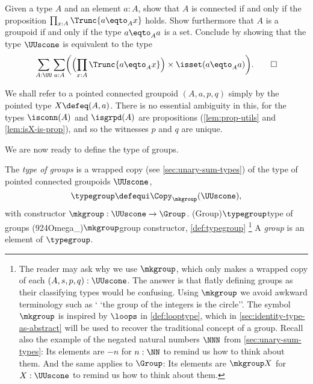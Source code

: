 \begin{xca}\label{xca:defgroup}
  Given a type $A$ and an element $a:A$, 
  show that $A$ is connected if and only if the proposition 
  $\prod_{x:A}\Trunc{a \eqto_A x}$ holds.
  Show furthermore that $A$ is a groupoid if and only if the 
  type $a\eqto_A a$ is a set.
  Conclude by showing that the type $\UUscone$ is equivalent to the type
  \[
    \sum_{A:\UU} \sum_{a:A} \biggl( \Bigl( \prod_{x:A}\Trunc{a \eqto_A x} \Bigr)
      \times \isset( a\eqto_A a ) \biggr).\qedhere
  \]
\end{xca}

\begin{remark}
  We shall refer to a pointed connected groupoid $(A,a,p,q)$ simply
  by the pointed type $X \defeq (A,a)$.
  There is no essential ambiguity in this, for
  the types $\isconn(A)$ and $\isgrpd(A)$ are propositions 
  (\cref{lem:prop-utils} and \cref{lem:isX-is-prop}),
  and so the witnesses $p$ and $q$ are unique.
\end{remark}

We are now ready to define the type of groups.

\begin{definition}\label{def:typegroup}
  The \emph{type of groups} is a wrapped copy (see \cref{sec:unary-sum-types})
  of the type of pointed connected groupoids $\UUscone$,
  \[
    \typegroup \defequi \Copy_{\mkgroup}(\UUscone),
  \]
  with constructor $\mkgroup : \UUscone \to \Group$.%
  \glossary(Group){$\protect\typegroup$}{type of groups}
  \glossary(924Omega_){$\protect\mkgroup$}{group constructor,
  \cref{def:typegroup}}%
  \footnote{%
  The reader may ask why we use $\mkgroup$, which only makes a wrapped
  copy of each $(A,s,p,q): \UUscone$. The answer is that flatly defining
  groups as their classifying types would be confusing.
  Using $\mkgroup$ we avoid awkward terminology such as `
  `the group of the integers is the circle''. 
  The symbol $\mkgroup$ is inspired by $\loops$
  in \cref{def:looptype}, which in \cref{sec:identity-type-as-abstract}
  will be used to recover the traditional concept of a group.
  Recall also the example of the negated natural numbers $\NNN$
  from \cref{sec:unary-sum-types}:
  Its elements are $-n$ for $n:\NN$ to remind us how to think about them.
  And the same applies to $\Group$:
  Its elements are $\mkgroup X$ for $X : \UUscone$
  to remind us how to think about them.
  }
  A \emph{group} is an element of $\typegroup$.
\end{definition}

